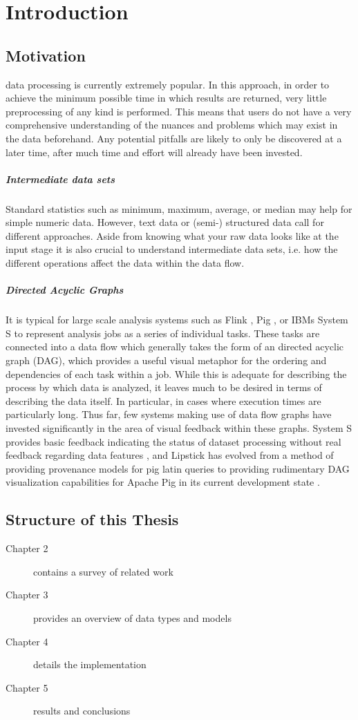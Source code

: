 \chapter{Introduction}
\label{sec:Introduction}



\section{Motivation}
 data processing is currently extremely popular. In this approach, in order to achieve the minimum possible time in which results are returned, very little preprocessing of any kind is performed. This means that users do not have a very comprehensive understanding of the nuances and problems which may exist in the data beforehand. Any potential pitfalls are likely to only be discovered at a later time, after much time and effort will already have been invested.

\paragraph{Intermediate data sets}
Standard statistics such as minimum, maximum, average, or median may help for simple numeric data. However, text data or (semi-) structured data call for different approaches. Aside from knowing what your raw data looks like at the input stage it is also crucial to understand intermediate data sets, i.e. how the different operations affect the data within the data flow.

\paragraph{Directed Acyclic Graphs}
It is typical for large scale analysis systems such as Flink \cite{Battre2010}, Pig \cite{Amsterdamer2011}, or IBMs System S \cite{Gedik2008} to represent analysis jobs as a series of individual tasks. These tasks are connected into a data flow which generally takes the form of an directed acyclic graph (DAG), which provides a useful visual metaphor for the ordering and dependencies of each task within a job. While this is adequate for describing the process by which data is analyzed, it leaves much to be desired in terms of describing the data itself. In particular, in cases where execution times are particularly long. Thus far, few systems making use of data flow graphs have invested significantly in the area of visual feedback within these graphs. System S provides basic feedback indicating the status of dataset processing without real feedback regarding data features \cite{Pauw2010}, and Lipstick has evolved from a method of providing provenance models for pig latin queries \cite{Amsterdamer2011} to providing rudimentary DAG visualization capabilities for Apache Pig in its current development state \cite{Amsterdamer2011}.

\section{Structure of this Thesis}

\begin{description}
\item[Chapter 2] contains a survey of related work
\item[Chapter 3] provides an overview of data types and models
\item[Chapter 4] details the implementation
\item[Chapter 5] results and conclusions
\end{description}